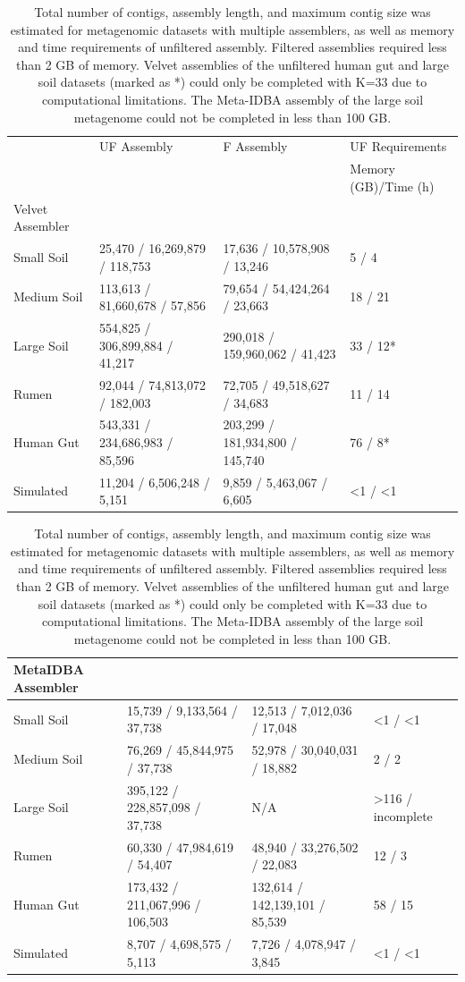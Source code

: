 \documentclass[10pt]{article}
\begin{document}
\begin{landscape}
\begin{table}[ht]
\caption{Total number of contigs, assembly length, and maximum contig size was estimated for metagenomic datasets with multiple assemblers, as well as memory and time requirements of unfiltered assembly.  Filtered assemblies required less than 2 GB of memory.  Velvet assemblies of the unfiltered human gut and large soil datasets (marked as *) could only be completed with K=33 due to computational limitations.  The Meta-IDBA assembly of the large soil metagenome could not be completed in less than 100 GB.}
\begin{tabular}{*{4}{p{5cm}}}

\hline
&UF Assembly &F Assembly 	&UF Requirements \\
& 	&	& Memory (GB)/Time (h)\\
\hline
Velvet Assembler  \\ 
\hline
Small Soil 	&25,470 / 16,269,879 / 118,753	&17,636 / 10,578,908 / 13,246		&5 / 4\\
Medium Soil	&113,613 / 81,660,678 / 57,856	&79,654 / 54,424,264 / 23,663		&18 / 21\\
Large Soil 	&554,825 / 306,899,884 / 41,217 	&290,018 / 159,960,062 /  41,423 	&33 / 12*\\
Rumen		&92,044 / 74,813,072 / 182,003	&72,705 / 49,518,627 / 34,683		&11 / 14\\
Human Gut	&543,331 / 234,686,983  / 85,596	&203,299 / 181,934,800 / 145,740	&76 / 8*\\
Simulated		&11,204 / 6,506,248 / 5,151		&9,859 / 5,463,067 / 6,605		&\textless1 / \textless1\\
\end{tabular}
\begin{tabular}{*{4}{p{5cm}}}
\hline
MetaIDBA Assembler  \\ 
\hline
Small Soil		&15,739 / 9,133,564 / 37,738 		&12,513 / 7,012,036 / 17,048	&\textless1 / \textless 1 \\
Medium Soil	&76,269 / 45,844,975 / 37,738	 	&52,978 / 30,040,031 / 18,882	&2 / 2\\
Large Soil		&395,122 / 228,857,098 /  37,738	&N/A						&\textgreater116 / incomplete\\
Rumen		&60,330 / 47,984,619 / 54,407		&48,940 / 33,276,502 / 22,083		&12 / 3\\
Human Gut 	&173,432 / 211,067,996 / 106,503	&132,614 / 142,139,101 / 85,539	&58 / 15\\
Simulated		&8,707 / 4,698,575 / 5,113		&7,726 / 4,078,947 / 3,845		&\textless1 / \textless1\\

\end{tabular}
\end{table}
\end{landscape}
\end{document}
